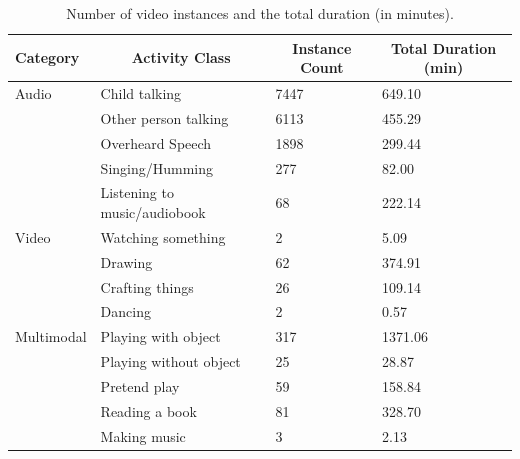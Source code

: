 \documentclass[
  man,floatsintext]{apa6}
\begin{document}
\begin{table}[tbp]

\begin{center}
\begin{threeparttable}

\caption{\label{tab:activity-classes-statistics}Number of video instances and the total duration (in minutes).}

\begin{tabular}{llll}
\toprule
Category & \multicolumn{1}{c}{Activity Class} & \multicolumn{1}{c}{Instance Count} & \multicolumn{1}{c}{Total Duration (min)}\\
\midrule
Audio & Child talking & 7447 & 649.10\\
 & Other person talking & 6113 & 455.29\\
 & Overheard Speech & 1898 & 299.44\\
 & Singing/Humming & 277 & 82.00\\
 & Listening to music/audiobook & 68 & 222.14\\
Video & Watching something & 2 & 5.09\\
 & Drawing & 62 & 374.91\\
 & Crafting things & 26 & 109.14\\
 & Dancing & 2 & 0.57\\
Multimodal & Playing with object & 317 & 1371.06\\
 & Playing without object & 25 & 28.87\\
 & Pretend play & 59 & 158.84\\
 & Reading a book & 81 & 328.70\\
 & Making music & 3 & 2.13\\
\bottomrule
\end{tabular}

\end{threeparttable}
\end{center}

\end{table}
\end{document}
